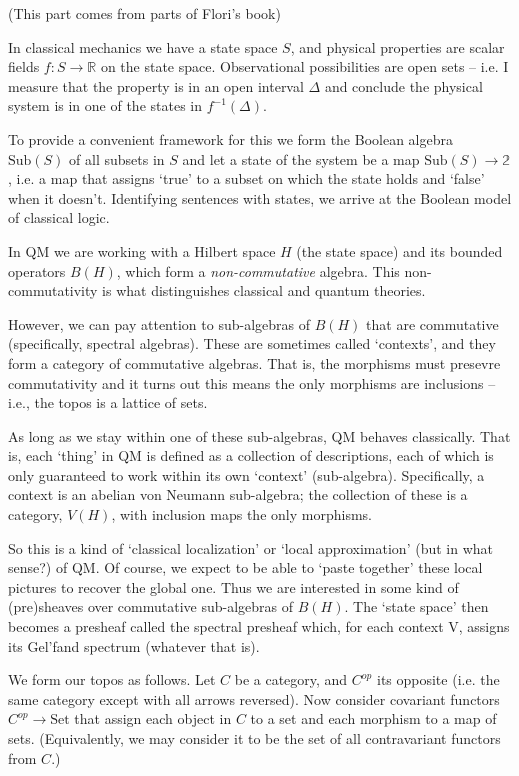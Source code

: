 \documentclass[oneside,english]{article}
\theoremstyle{plain}
\theoremstyle{definition}
\theoremstyle{definition}
\begin{document}
(This part comes from parts of Flori's book)

In classical mechanics we have a state space $S$, and physical properties are scalar fields $f:S\to \mathbb{R}$ on the state space. Observational possibilities are open sets -- i.e. I measure that the property is in an open interval $\Delta$ and conclude the physical system is in one of the states in $f^{-1}(\Delta)$.

To provide a convenient framework for this we form the Boolean algebra $\text{Sub}(S)$ of all subsets in $S$ and let a state of the system be a map $\text{Sub}(S)\to \mathbb{2}$, i.e. a map that assigns `true' to a subset on which the state holds and `false' when it doesn't. Identifying sentences with states, we arrive at the Boolean model of classical logic.

In QM we are working with a Hilbert space $H$ (the state space) and its bounded operators $B(H)$, which form a \emph{non-commutative} algebra. This non-commutativity is what distinguishes classical and quantum theories. 

However, we can pay attention to sub-algebras of $B(H)$ that are commutative (specifically, spectral algebras). These are sometimes called `contexts', and they form a category of commutative algebras. That is, the morphisms must presevre commutativity and it turns out this means the only morphisms are inclusions -- i.e., the topos is a lattice of sets. 

As long as we stay within one of these sub-algebras, QM behaves classically. That is, each `thing' in QM is defined as a collection of descriptions, each of which is only guaranteed to work within its own `context' (sub-algebra). Specifically, a context is an abelian von Neumann sub-algebra; the collection of these is a category, $V(H)$, with inclusion maps the only morphisms.

So this is a kind of `classical localization' or `local approximation' (but in what sense?) of QM. Of course, we expect to be able to `paste together' these local pictures to recover the global one. Thus we are interested in some kind of (pre)sheaves over commutative sub-algebras of $B(H)$. The `state space' then becomes a presheaf called the spectral presheaf which, for each context V, assigns its Gel'fand spectrum (whatever that is).

We form our topos as follows. Let $C$ be a category, and $C^{op}$ its opposite (i.e. the same category except with all arrows reversed). Now consider covariant functors $C^{op}\to\text{Set}$ that assign each object in $C$ to a set and each morphism to a map of sets. (Equivalently, we may consider it to be the set of all contravariant functors from $C$.)
\end{document}
